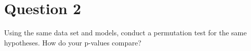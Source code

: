 \section{Question 2}

\begin{question}
    Using the same data set and models, conduct a permutation test for the same hypotheses. How do your p-values compare?
\end{question}

\begin{answer}
    
\end{answer}
